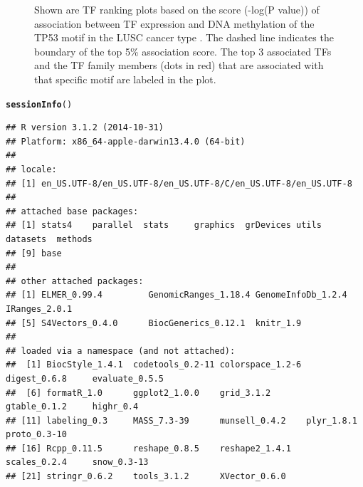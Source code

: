 \documentclass{article}\usepackage[]{graphicx}\usepackage[usenames,dvipsnames]{color}
\makeatletter
\newcommand{\hlstd}[1]{\textcolor[rgb]{0.345,0.345,0.345}{#1}}%
\newcommand{\hlkwd}[1]{\textcolor[rgb]{0.737,0.353,0.396}{\textbf{#1}}}%
\newenvironment{kframe}{%
 \def\at@end@of@kframe{}%
 \ifinner\ifhmode%
  \def\at@end@of@kframe{\end{minipage}}%
  \begin{minipage}{\columnwidth}%
 \fi\fi%
 \def\FrameCommand##1{\hskip\@totalleftmargin \hskip-\fboxsep
 \colorbox{shadecolor}{##1}\hskip-\fboxsep
     \hskip-\linewidth \hskip-\@totalleftmargin \hskip\columnwidth}%
 \MakeFramed {\advance\hsize-\width
   \@totalleftmargin\z@ \linewidth\hsize
   \@setminipage}}%
 {\par\unskip\endMakeFramed%
 \at@end@of@kframe}
\newenvironment{knitrout}{}{} %
\makeatother
\begin{document}
\begin{figure}[H]
\begin{knitrout}
{}




\end{knitrout}

\protect\caption{Shown are TF ranking plots based on 
the score (-log(P value)) of association between TF expression and DNA methylation of 
the TP53 motif in the LUSC cancer type . The dashed line indicates the boundary 
of the top 5\% association score. The top 3 associated TFs and the TF family members
(dots in red) that are associated with that specific motif are labeled in the plot.
\label{fig:figure7}}
\end{figure}

\newpage
\begin{knitrout}
\color{fgcolor}\begin{kframe}
\begin{alltt}
\hlkwd{sessionInfo}\hlstd{()}
\end{alltt}
\begin{verbatim}
## R version 3.1.2 (2014-10-31)
## Platform: x86_64-apple-darwin13.4.0 (64-bit)
## 
## locale:
## [1] en_US.UTF-8/en_US.UTF-8/en_US.UTF-8/C/en_US.UTF-8/en_US.UTF-8
## 
## attached base packages:
## [1] stats4    parallel  stats     graphics  grDevices utils     datasets  methods  
## [9] base     
## 
## other attached packages:
## [1] ELMER_0.99.4         GenomicRanges_1.18.4 GenomeInfoDb_1.2.4   IRanges_2.0.1       
## [5] S4Vectors_0.4.0      BiocGenerics_0.12.1  knitr_1.9           
## 
## loaded via a namespace (and not attached):
##  [1] BiocStyle_1.4.1  codetools_0.2-11 colorspace_1.2-6 digest_0.6.8     evaluate_0.5.5  
##  [6] formatR_1.0      ggplot2_1.0.0    grid_3.1.2       gtable_0.1.2     highr_0.4       
## [11] labeling_0.3     MASS_7.3-39      munsell_0.4.2    plyr_1.8.1       proto_0.3-10    
## [16] Rcpp_0.11.5      reshape_0.8.5    reshape2_1.4.1   scales_0.2.4     snow_0.3-13     
## [21] stringr_0.6.2    tools_3.1.2      XVector_0.6.0
\end{verbatim}
\end{kframe}
\end{knitrout}
\end{document}
